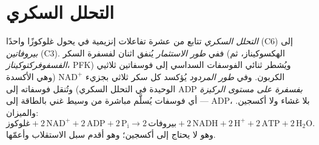 \section{التحلل السكري}

\begin{definition}\label{def:b1:respiration-fermentation:glycolysis}
\emph{التحلل السكري} تتابع من عشرة تفاعلات إنزيمية في 
يحول غلوكوزًا واحدًا (C6) إلى \emph{بيروفاتين} (C3). ففي \emph{طور
الاستثمار} يُنفق  اثنان لفسفرة السكر (الهكسوكيناز، ثم
\emph{الفسفوفركتوكيناز}، PFK) ويُشطر ثنائي الفوسفات السداسي إلى
فوسفاتين ثلاثيي الكربون. وفي \emph{طور المردود} يُؤكسد كل سكر ثلاثي
بجزيء $\mathrm{NAD^+}$ (وهي الأكسدة الوحيدة في التحلل السكري) وتُنقل
فوسفاته إلى ADP \emph{بفسفرة على مستوى الركيزة}
--- أي فوسفات يُسلَّم مباشرة من وسيط غني بالطاقة إلى ADP، بلا غشاء
ولا أكسجين. والميزان:
\[
\text{غلوكوز} + 2\,\mathrm{NAD^+} + 2\,\mathrm{ADP} + 2\,\mathrm{P_i}
\to 2\,\text{بيروفات} + 2\,\mathrm{NADH} + 2\,\mathrm{H^+} + 2\,\mathrm{ATP} + 2\,\mathrm{H_2O} .
\]
وهو لا يحتاج إلى أكسجين؛ وهو أقدم سبل الاستقلاب وأعمّها.
\end{definition}

